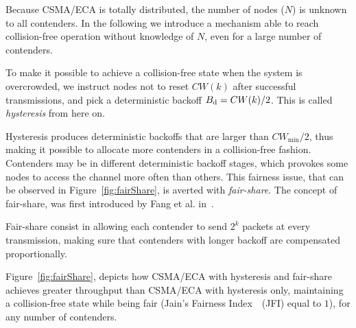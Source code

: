 Because CSMA/ECA is totally distributed, the number of nodes ($N$) is unknown to all contenders. In the following we introduce a mechanism able to reach collision-free operation without knowledge of $N$, even for a large number of contenders.



To make it possible to achieve a collision-free state when the system is overcrowded, we instruct nodes not to reset $CW(k)$ after successful transmissions, and pick a deterministic backoff $B_{\mbox{\scriptsize{d}}}=CW(k)/2$. This is called \emph{hysteresis} from here on. 




Hysteresis produces deterministic backoffs that are larger than $CW_{\min}/2$, thus making it possible to allocate more contenders in a collision-free fashion. Contenders may be in different deterministic backoff stages, which provokes some nodes to access the channel more often than others. This fairness issue, that can be observed in Figure~\ref{fig:fairShare}, is averted with \emph{fair-share}. The concept of fair-share, was first introduced by Fang et al. in~\cite{L_MAC2}.


Fair-share consist in allowing each contender to send $2^{k}$ packets at every transmission, making sure that contenders with longer backoff are compensated proportionally.

Figure~\ref{fig:fairShare}, depicts how CSMA/ECA with hysteresis and fair-share achieves greater throughput than CSMA/ECA with hysteresis only, maintaining a collision-free state while being fair (Jain's Fairness Index~\cite{JFI}~(JFI) equal to $1$), for any number of contenders.

